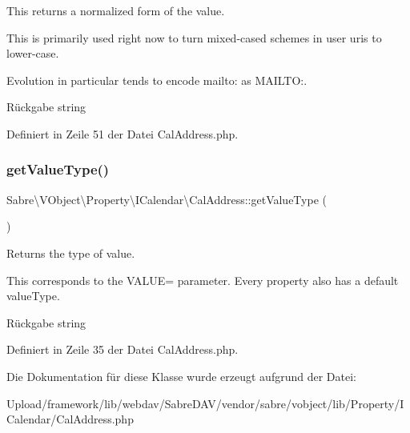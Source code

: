 This returns a normalized form of the value.

This is primarily used right now to turn mixed-\/cased schemes in user uris to lower-\/case.

Evolution in particular tends to encode mailto\+: as M\+A\+I\+L\+TO\+:.

\begin{DoxyReturn}{Rückgabe}
string 
\end{DoxyReturn}


Definiert in Zeile 51 der Datei Cal\+Address.\+php.

\mbox{\label{class_sabre_1_1_v_object_1_1_property_1_1_i_calendar_1_1_cal_address_aab15143a7f1484249653acd6fb884979}} 
\subsubsection{\texorpdfstring{get\+Value\+Type()}{getValueType()}}
{\footnotesize\ttfamily Sabre\textbackslash{}\+V\+Object\textbackslash{}\+Property\textbackslash{}\+I\+Calendar\textbackslash{}\+Cal\+Address\+::get\+Value\+Type (\begin{DoxyParamCaption}{ }\end{DoxyParamCaption})}

Returns the type of value.

This corresponds to the V\+A\+L\+UE= parameter. Every property also has a \textquotesingle{}default\textquotesingle{} value\+Type.

\begin{DoxyReturn}{Rückgabe}
string 
\end{DoxyReturn}


Definiert in Zeile 35 der Datei Cal\+Address.\+php.



Die Dokumentation für diese Klasse wurde erzeugt aufgrund der Datei\+:\begin{DoxyCompactItemize}
\item 
Upload/framework/lib/webdav/\+Sabre\+D\+A\+V/vendor/sabre/vobject/lib/\+Property/\+I\+Calendar/Cal\+Address.\+php\end{DoxyCompactItemize}
